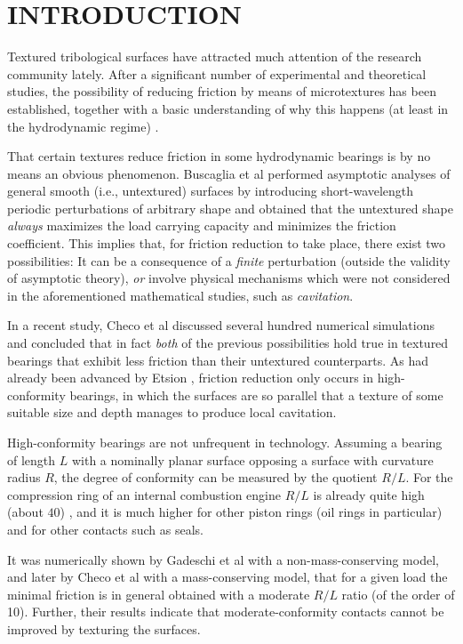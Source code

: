 \setcounter{table}{0} 

\section{INTRODUCTION}

Textured tribological surfaces have attracted much attention of
the research community lately. After a significant number of
experimental and theoretical studies, the possibility of
reducing friction by means of microtextures has been established,
together with a basic understanding of why this happens (at
least in the hydrodynamic regime) \cite{dobrica2010,gad2012,etsion2013,checo13}.

That certain textures reduce friction in 
some hydrodynamic bearings is by no means an
obvious phenomenon. Buscaglia et al \cite{buscaglia05c,buscaglia07} performed
asymptotic analyses of general smooth (i.e., untextured) surfaces 
by introducing short-wavelength
periodic perturbations of arbitrary shape and obtained
that the untextured shape {\em always} maximizes the load 
carrying capacity and minimizes the friction coefficient.
This implies that, for friction reduction to take place,
there exist two possibilities: It can be a consequence 
of a {\em finite} perturbation (outside the validity of
asymptotic theory),
{\em or} involve physical mechanisms which were
not considered in the aforementioned mathematical studies, such as
{\em cavitation}. 

In a recent study, Checo et al \cite{checo13} discussed
several hundred numerical simulations and concluded that
in fact {\em both} of the previous possibilities hold
true in textured bearings that exhibit less friction than
their untextured counterparts. As had already been
advanced by Etsion \cite{etsion2013}, friction reduction
only occurs in high-conformity bearings, in which the
surfaces are so parallel that a texture of some suitable
size and depth manages to produce local cavitation.

High-conformity bearings are not unfrequent in technology.
Assuming a bearing of length $L$ with a nominally planar surface
opposing a surface with curvature radius $R$, the degree
of conformity can be measured by the quotient $R/L$. For
the compression ring of an internal combustion
engine $R/L$ is already quite high (about $40$) \cite{gad2012}, 
and it is much higher for other piston rings 
(oil rings in particular) and for other contacts such as
seals.

It was numerically shown by Gadeschi et al \cite{gad2012} with a
non-mass-conserving model, and later by Checo et al \cite{checo13}
with a mass-conserving model, that for a given load the
minimal friction is in general obtained with a moderate
$R/L$ ratio (of the order of 10). 
Further, their results indicate that  moderate-conformity contacts
cannot be improved by texturing the surfaces.

